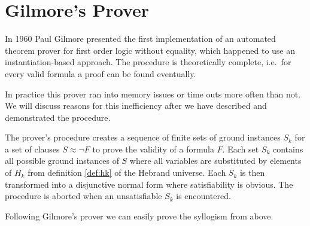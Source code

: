 \section{Gilmore's Prover}

In 1960 Paul Gilmore presented the first {\myem implementation} of an automated 
theorem prover \cite{5392528} for first order logic without equality,
which happened to use an instantiation-based approach. 
The procedure is theoretically complete, i.e.~for every valid formula 
a proof can be found eventually.

In practice this prover ran into memory issues or time outs more often than not.
We will discuss reasons for this inefficiency after we have described and demonstrated the procedure.

The prover's procedure 
creates a sequence of finite sets of ground instances $S_k$ 
for a set of clauses $S\approx\lnot F$ to prove the validity of a formula $F$.
Each set $S_k$ contains all possible ground instances of $S$ 
where all variables are substituted by elements of $H_k$
from definition \ref{def:hk} of the Hebrand universe.
Each $S_k$ is then transformed into a disjunctive normal form where satisfiability is obvious.
The procedure is aborted when an unsatisfiable $S_k$ is encountered.

Following Gilmore's prover we can easily prove the syllogism from above.

